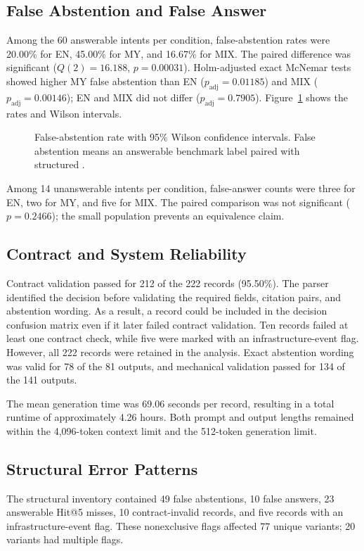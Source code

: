\documentclass[a4paper,conference]{IEEEtran}
\newcommand{\code}[1]{\texttt{\detokenize{#1}}}
\begin{document}
\subsection{False Abstention and False Answer}
Among the 60 answerable intents per condition, false-abstention rates were 20.00\% for EN, 45.00\% for MY, and 16.67\% for MIX. The paired difference was significant ($Q(2)=16.188$, $p=0.00031$). Holm-adjusted exact McNemar tests showed higher MY false abstention than EN ($p_{\mathrm{adj}}=0.01185$) and MIX ($p_{\mathrm{adj}}=0.00146$); EN and MIX did not differ ($p_{\mathrm{adj}}=0.7905$). Figure~\ref{fig:false-abstention} shows the rates and Wilson intervals.

\begin{figure}[t]
\centering

\caption{False-abstention rate with 95\% Wilson confidence intervals. False abstention means an answerable benchmark label paired with structured \code{ABSTAIN}.}
\label{fig:false-abstention}
\end{figure}

Among 14 unanswerable intents per condition, false-answer counts were three for EN, two for MY, and five for MIX. The paired comparison was not significant ($p=0.2466$); the small population prevents an equivalence claim.

\subsection{Contract and System Reliability}
Contract validation passed for 212 of the 222 records (95.50\%). The parser identified the decision before validating the required fields, citation pairs, and abstention wording. As a result, a record could be included in the decision confusion matrix even if it later failed contract validation. Ten records failed at least one contract check, while five were marked with an infrastructure-event flag. However, all 222 records were retained in the analysis. Exact abstention wording was valid for 78 of the 81 \code{ABSTAIN} outputs, and mechanical validation passed for 134 of the 141 \code{ANSWER} outputs.

The mean generation time was 69.06 seconds per record, resulting in a total runtime of approximately 4.26 hours. Both prompt and output lengths remained within the 4,096-token context limit and the 512-token generation limit.

\subsection{Structural Error Patterns}
The structural inventory contained 49 false abstentions, 10 false answers, 23 answerable Hit@5 misses, 10 contract-invalid records, and five records with an infrastructure-event flag. These nonexclusive flags affected 77 unique variants; 20 variants had multiple flags.
\end{document}
